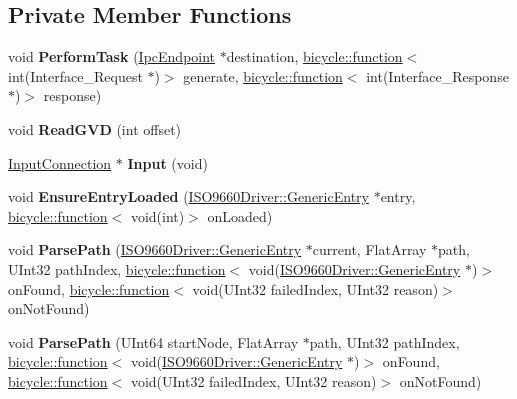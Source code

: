 \subsection*{Private Member Functions}
\begin{DoxyCompactItemize}
\item 
\mbox{\label{class_file_system___i_s_o9660_acfb7cd8374d0ec8065ac96545b759260}} 
void {\bfseries Perform\+Task} (\hyperlink{class_ipc_endpoint}{Ipc\+Endpoint} $\ast$destination, \hyperlink{classbicycle_1_1function}{bicycle\+::function}$<$ int(Interface\+\_\+\+Request $\ast$)$>$ generate, \hyperlink{classbicycle_1_1function}{bicycle\+::function}$<$ int(Interface\+\_\+\+Response $\ast$)$>$ response)
\item 
\mbox{\label{class_file_system___i_s_o9660_a10bd4494fa7f5ede324528c892462ac0}} 
void {\bfseries Read\+G\+VD} (int offset)
\item 
\mbox{\label{class_file_system___i_s_o9660_a8c423a8e7aa2d5abd4a598c6933472dc}} 
\hyperlink{class_generic_provider_1_1_input_connection}{Input\+Connection} $\ast$ {\bfseries Input} (void)
\item 
\mbox{\label{class_file_system___i_s_o9660_a31d06e786de18d10b4b02c0d82c2a6d5}} 
void {\bfseries Ensure\+Entry\+Loaded} (\hyperlink{class_i_s_o9660_driver_1_1_generic_entry}{I\+S\+O9660\+Driver\+::\+Generic\+Entry} $\ast$entry, \hyperlink{classbicycle_1_1function}{bicycle\+::function}$<$ void(int)$>$ on\+Loaded)
\item 
\mbox{\label{class_file_system___i_s_o9660_a67e4d00408d0fc5ec48aa5afc27c46c2}} 
void {\bfseries Parse\+Path} (\hyperlink{class_i_s_o9660_driver_1_1_generic_entry}{I\+S\+O9660\+Driver\+::\+Generic\+Entry} $\ast$current, Flat\+Array $\ast$path, U\+Int32 path\+Index, \hyperlink{classbicycle_1_1function}{bicycle\+::function}$<$ void(\hyperlink{class_i_s_o9660_driver_1_1_generic_entry}{I\+S\+O9660\+Driver\+::\+Generic\+Entry} $\ast$)$>$ on\+Found, \hyperlink{classbicycle_1_1function}{bicycle\+::function}$<$ void(U\+Int32 failed\+Index, U\+Int32 reason)$>$ on\+Not\+Found)
\item 
\mbox{\label{class_file_system___i_s_o9660_a823edd7eab33a4d9edb576b53d7ee1c0}} 
void {\bfseries Parse\+Path} (U\+Int64 start\+Node, Flat\+Array $\ast$path, U\+Int32 path\+Index, \hyperlink{classbicycle_1_1function}{bicycle\+::function}$<$ void(\hyperlink{class_i_s_o9660_driver_1_1_generic_entry}{I\+S\+O9660\+Driver\+::\+Generic\+Entry} $\ast$)$>$ on\+Found, \hyperlink{classbicycle_1_1function}{bicycle\+::function}$<$ void(U\+Int32 failed\+Index, U\+Int32 reason)$>$ on\+Not\+Found)
\end{DoxyCompactItemize}
